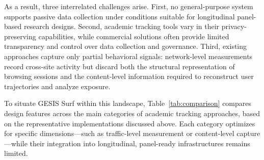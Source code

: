 \documentclass[preprint,12pt,a4paper]{elsarticle}
\begin{document}
As a result, three interrelated challenges arise. First, no general-purpose system supports passive data collection under conditions suitable for longitudinal panel-based research designs. Second, academic tracking tools vary in their privacy-preserving capabilities, while commercial solutions often provide limited transparency and control over data collection and governance. Third, existing approaches capture only partial behavioral signals: network-level measurements record cross-site activity \cite{holz2020cryptomining} but discard both the structural representation of browsing sessions and the content-level information required to reconstruct user trajectories and analyze exposure.

To situate GESIS Surf within this landscape, Table~\ref{tab:comparison} compares design features across the main categories of academic tracking approaches, based on the representative implementations discussed above. Each category optimizes for specific dimensions---such as traffic-level measurement or content-level capture---while their integration into longitudinal, panel-ready infrastructures remains limited.
\end{document}
